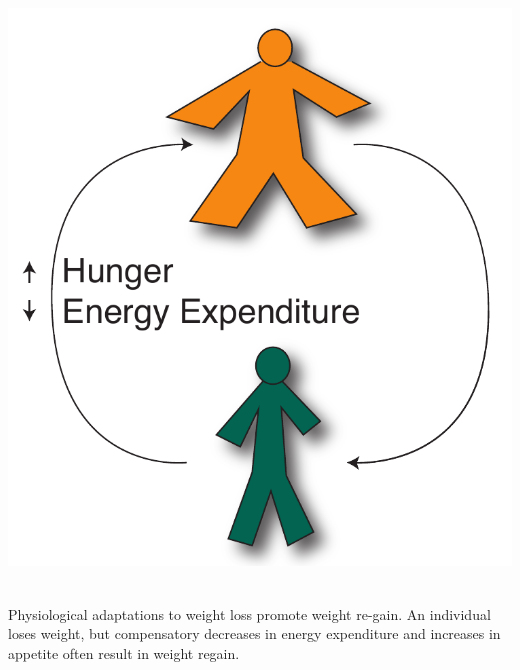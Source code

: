 \documentclass{tufte-handout}
\begin{document}
\begin{marginfigure}
\includegraphics{figures/Loss-Regain.pdf}\
\caption{Physiological adaptations to weight loss promote weight re-gain.  An individual loses weight, but compensatory decreases in energy expenditure and increases in appetite often result in weight regain.}
\label{fig:loss-regain}
\end{marginfigure}




\end{document}
